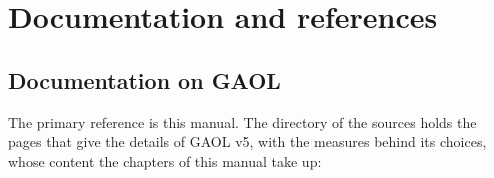\documentclass[12pt,a4paper,twoside,openright]{book}
\begin{document}
\cleardoublepage
\pagestyle{BIBLIO}



\appendix
\pagestyle{YO}
\renewcommand{\chaptermark}[1]{\markboth{\appendixname\ \thechapter\ - \ #1}{}}

\chapter{Documentation and references}\label{chap:documentation}

\section{Documentation on GAOL}

The primary reference is this manual. The directory  of the sources
holds the pages that give the details of GAOL v5, with the measures behind
its choices, whose content the chapters of this manual take up:
\end{document}
